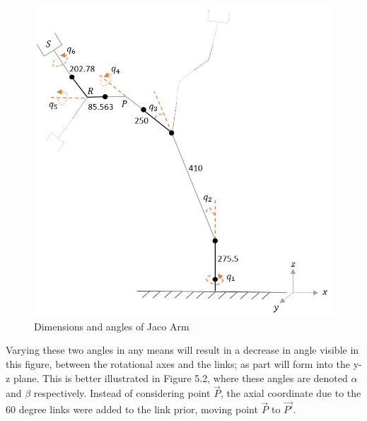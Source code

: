 \documentclass[12pt,openany,a4paper]{book}
\begin{document}
\begin{center}
\begin{figure}[htb]
  \includegraphics[width=0.9\linewidth]{jaco_angles_figure.jpg}
\caption{Dimensions and angles of Jaco Arm}
\end{figure}
\end{center}

Varying these two angles in any means will result in a decrease in angle visible in this figure, between the rotational axes and the links; as part will form into the y-z plane. This is better illustrated in Figure 5.2, where these angles are denoted $\alpha$ and $\beta$ respectively. Instead of considering point $\vec{P}$, the axial coordinate due to the 60 degree links were added to the link prior, moving point $\vec{P}$ to $\vec{P'}$.
\end{document}
